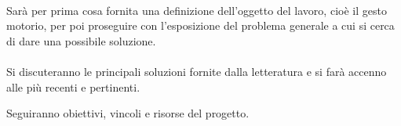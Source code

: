 {\bfseries
\vspace{1in}

\paragraph{}
Sarà per prima cosa fornita una definizione dell'oggetto del lavoro,
cioè il \rm{gesto motorio}, per poi proseguire con l'esposizione del problema generale
a cui si cerca di dare una possibile soluzione.


\paragraph{}
Si discuteranno le principali soluzioni fornite dalla letteratura
e si farà accenno alle più recenti e pertinenti.

\par{}
Seguiranno obiettivi, vincoli e risorse del progetto.

\vfill
}